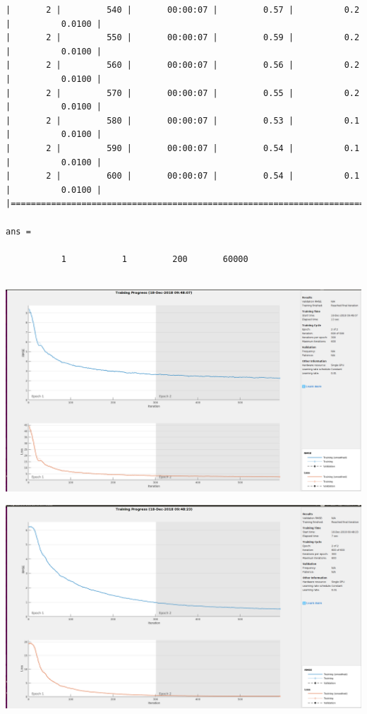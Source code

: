 \documentclass[11pt]{article}
\makeatletter
\def\maxwidth{\ifdim\Gin@nat@width>\linewidth\linewidth
    \else\Gin@nat@width\fi}
\let\Oldincludegraphics\includegraphics
\renewcommand{\includegraphics}[1]{\Oldincludegraphics[width=.8\maxwidth]{#1}}
\makeatother
\begin{document}
\begin{Verbatim}[commandchars=\\\{\}]
|       2 |         540 |       00:00:07 |         0.57 |          0.2 |          0.0100 |
|       2 |         550 |       00:00:07 |         0.59 |          0.2 |          0.0100 |
|       2 |         560 |       00:00:07 |         0.56 |          0.2 |          0.0100 |
|       2 |         570 |       00:00:07 |         0.55 |          0.2 |          0.0100 |
|       2 |         580 |       00:00:07 |         0.53 |          0.1 |          0.0100 |
|       2 |         590 |       00:00:07 |         0.54 |          0.1 |          0.0100 |
|       2 |         600 |       00:00:07 |         0.54 |          0.1 |          0.0100 |
|========================================================================================|

ans =

           1           1         200       60000


    \end{Verbatim}

    \includegraphics{AE1.png}

    \includegraphics{AE2.png}
\end{document}
